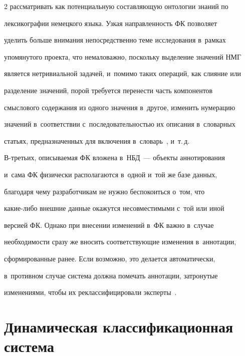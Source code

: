 \begin{multicols}{2}
рассматривать как потенциальную составляющую онтологии знаний по 


лексикографии немецкого языка. Узкая направленность ФК позволяет 


уделить больше внимания непосредственно теме исследования в~рамках 


упомянутого проекта, что немаловажно, поскольку выделение значений НМГ 


является нетривиальной задачей, и~помимо таких операций, как слияние или 


разделение значений, порой требуется перенести часть компонентов 


смыслового содержания из одного значения в~другое, изменить нумерацию 


значений в~соответствии с~последовательностью их описания в~словарных 


статьях, предназначенных для включения в~словарь~\cite{17-gon}, и~т.\,д.





В-третьих, описываемая ФК вложена в~НБД~--- объекты аннотирования 


и~сама ФК физически располагаются в~одной и~той же базе данных, 


благодаря чему разработчикам не нужно беспокоиться о~том, что  


ка\-кие-ли\-бо внешние данные окажутся не\-со\-вмес\-ти\-мы\-ми с~той или иной 


версией ФК. Однако при внесении изменений в~ФК важно в~случае 


необходимости сразу же вносить соответствующие изменения в~аннотации, 


сформированные ранее. Если возможно, это делается автоматически, 


в~противном случае система должна помечать аннотации, затронутые 


изменениями, чтобы их реклассифицировали эксперты~\cite{3-gon}.





\vspace*{-9pt}





\section{Динамическая классификационная система}






\end{multicols}
